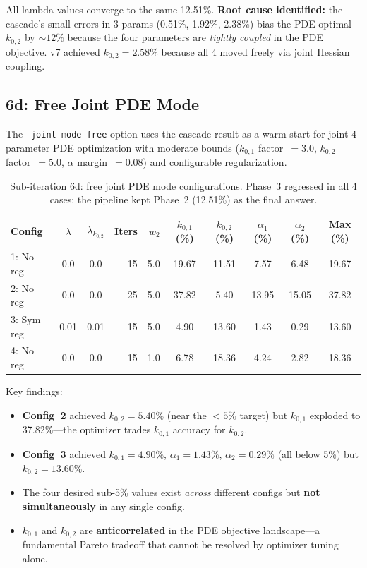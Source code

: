 \documentclass[11pt]{article}
\begin{document}
All lambda values converge to the same 12.51\%.
\textbf{Root cause identified:} the cascade's small errors in 3 params
(0.51\%, 1.92\%, 2.38\%) bias the PDE-optimal $k_{0,2}$ by ${\sim}12\%$
because the four parameters are \emph{tightly coupled} in the PDE objective.
v7 achieved $k_{0,2} = 2.58\%$ because all 4 moved freely via joint Hessian
coupling.

\subsection{6d: Free Joint PDE Mode}

The \texttt{--joint-mode free} option uses the cascade result as a warm start
for joint 4-parameter PDE optimization with moderate bounds ($k_{0,1}$
factor~$= 3.0$, $k_{0,2}$ factor~$= 5.0$, $\alpha$ margin~$= 0.08$)
and configurable regularization.

\begin{table}[htbp]
  \centering
  \caption{Sub-iteration 6d: free joint PDE mode configurations.
           Phase~3 regressed in all 4 cases; the pipeline kept Phase~2
           (12.51\%) as the final answer.}
  \label{tab:s6d}
  \begin{tabular}{l c c r r
                    S[round-precision=1] S[round-precision=1]
                    S[round-precision=1] S[round-precision=1]
                    S[round-precision=1]}
    \toprule
    Config & {$\lambda$} & {$\lambda_{k_{0,2}}$}
           & {Iters} & {$w_2$}
           & {$k_{0,1}$ (\%)} & {$k_{0,2}$ (\%)}
           & {$\alpha_1$ (\%)} & {$\alpha_2$ (\%)}
           & {Max (\%)} \\
    : No reg   & 0.0  & 0.0  & 15 & 5.0 & 19.67 & 11.51 &  7.57 &  6.48 & 19.67 \\
    2: No reg   & 0.0  & 0.0  & 25 & 5.0 & 37.82 &  5.40 & 13.95 & 15.05 & 37.82 \\
    3: Sym reg  & 0.01 & 0.01 & 15 & 5.0 &  4.90 & 13.60 &  1.43 &  0.29 & 13.60 \\
    4: No reg   & 0.0  & 0.0  & 15 & 1.0 &  6.78 & 18.36 &  4.24 &  2.82 & 18.36 \\
    \bottomrule
  \end{tabular}
\end{table}

Key findings:
\begin{itemize}
  \item \textbf{Config~2} achieved $k_{0,2} = 5.40\%$ (near the $< 5\%$
        target) but $k_{0,1}$ exploded to 37.82\%---the optimizer trades
        $k_{0,1}$ accuracy for $k_{0,2}$.
  \item \textbf{Config~3} achieved $k_{0,1} = 4.90\%$, $\alpha_1 = 1.43\%$,
        $\alpha_2 = 0.29\%$ (all below 5\%) but $k_{0,2} = 13.60\%$.
  \item The four desired sub-5\% values exist \emph{across} different
        configs but \textbf{not simultaneously} in any single config.
  \item $k_{0,1}$ and $k_{0,2}$ are \textbf{anticorrelated} in the PDE
        objective landscape---a fundamental Pareto tradeoff that cannot
        be resolved by optimizer tuning alone.
\end{itemize}
\end{document}
